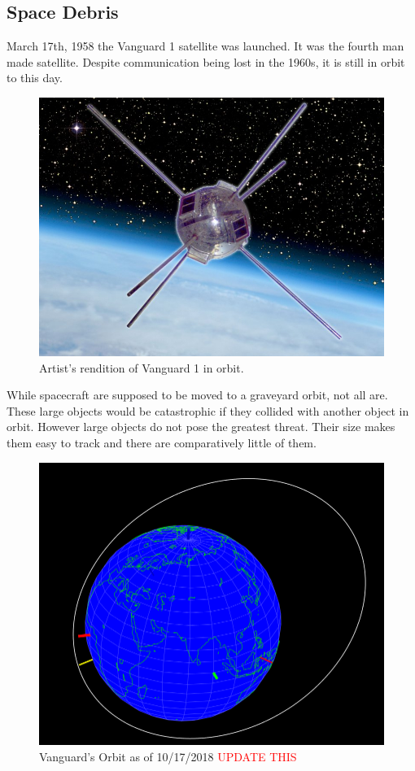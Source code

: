 \documentclass[12pt]{article}
\begin{document}
	\subsection{Space Debris}
	
	March 17th, 1958 the Vanguard 1 satellite was launched. It was the fourth man made satellite. Despite communication being lost in the 1960s, it is still in orbit to this day\cite{usnrl_2008}. \par 
	
	\begin{figure}[h!]
		\centering
		\includegraphics[width=0.7\linewidth]{Vanguard_1_composite}
		\caption{Artist's rendition of Vanguard 1 in orbit.}
		\label{fig:vanguard1composite}
	\end{figure}
	
	While spacecraft are supposed to be moved to a graveyard orbit, not all are. These large objects would be catastrophic if they collided with another object in orbit. However large objects do not pose the greatest threat. Their size makes them easy to track and there are comparatively little of them. 
	
	\begin{figure}
		\centering
		\includegraphics[width=0.7\linewidth]{Vanguard_1_orbit}
		\caption{Vanguard's Orbit as of 10/17/2018 \textcolor{red}{UPDATE THIS}}
		\label{fig:vanguard1orbit}
	\end{figure}
\end{document}
